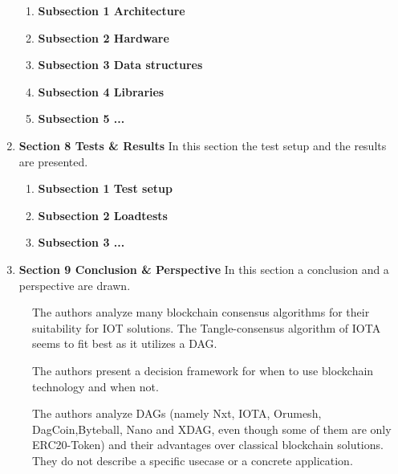 \documentclass[
    ngerman,american
    ]{scrartcl}
\newcommand{\lang}{en}
\begin{document}
\begin{enumerate}
\begin{enumerate}
                        \item \textbf{Subsection 1 Architecture}
                        \item \textbf{Subsection 2 Hardware}
                        \item \textbf{Subsection 3 Data structures}
                        \item \textbf{Subsection 4 Libraries}
                        \item \textbf{Subsection 5 ...}
                    \end{enumerate}
            \item \textbf{Section 8 Tests \& Results} In this section the test setup and the results are presented.
                    \begin{enumerate}
                        \item \textbf{Subsection 1 Test setup}
                        \item \textbf{Subsection 2 Loadtests}
                        \item \textbf{Subsection 3 ...}
                    \end{enumerate}
            \item \textbf{Section 9 Conclusion \& Perspective} In this section a conclusion and a perspective are drawn.
        \end{enumerate}


        \sectionSource{\lang}
        \sectionSourceDescription{\lang}

        \begin{description}
          \item[\cite{DBLP:journals/corr/abs-1809-05613}] The authors analyze many blockchain consensus algorithms for their suitability for IOT solutions. The Tangle-consensus algorithm of IOTA seems to fit best as it utilizes a DAG.
          \item[\cite{iotbds18}] The authors present a decision framework for when to use blockchain technology and when not.
          \item[\cite{8632193}] The authors analyze DAGs (namely Nxt, IOTA, Orumesh, DagCoin,Byteball, Nano and XDAG, even though some of them are only ERC20-Token) and their advantages over classical blockchain solutions. They do not describe a specific usecase or a concrete application.
        \end{description}

        \newpage

      \printbibliography
    
\end{document}
